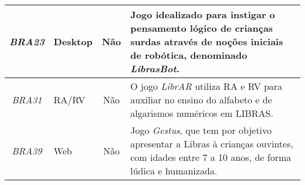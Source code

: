 \begin{small}
\begin{longtable}{|c|>{\centering\arraybackslash}p{2.75cm}|c|p{10cm}|}
\textit{BRA23} & Desktop & Não & Jogo idealizado para instigar o pensamento lógico de crianças surdas através de noções iniciais de robótica, denominado \textit{LibrasBot}. \\ \hline
\textit{BRA31} & RA/RV & Não & O jogo \textit{LibrAR} utiliza RA e RV para auxiliar no ensino do alfabeto e de algarismos numéricos em LIBRAS. \\ \hline
\textit{BRA39} & Web & Não & Jogo \textit{Gestus}, que tem por objetivo apresentar a Libras à crianças ouvintes, com idades entre 7 a 10 anos, de forma lúdica e humanizada. \\ \hline

\end{longtable}
\end{small}
